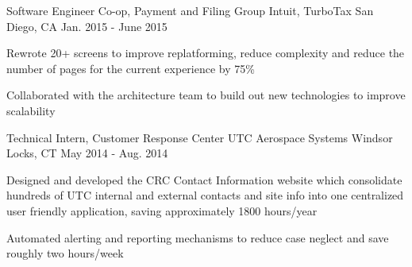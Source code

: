 \begin{cventries}
  \cventry
    {Software Engineer Co-op, Payment and Filing Group} %
    {Intuit, TurboTax} %
    {San Diego, CA} %
    {Jan. 2015 - June 2015} %
    {
      \begin{cvitems} %
        \item {Rewrote 20+ screens to improve replatforming, reduce complexity and reduce the number of pages for the current experience by 75\%}
        \item {Collaborated with the architecture team to build out new technologies to improve scalability}
      \end{cvitems}
    }

  \cventry
    {Technical Intern, Customer Response Center} %
    {UTC Aerospace Systems} %
    {Windsor Locks, CT} %
    {May 2014 - Aug. 2014} %
    {
      \begin{cvitems} %
        \item {Designed and developed the CRC Contact Information website which consolidate hundreds of UTC internal and external contacts and site info into one centralized user friendly application, saving approximately 1800 hours/year}
        \item {Automated alerting and reporting mechanisms to reduce case neglect and save roughly two hours/week}
      \end{cvitems}
    }


\end{cventries}
